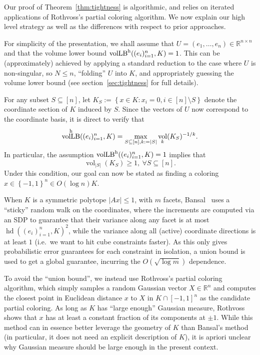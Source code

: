 \documentclass[11pt]{article}
\newcommand{\R}{{\mathbb{R}}}
\newcommand{\set}[1]{\left\{ #1 \right\}}
\DeclareMathOperator{\vollb}{volLB}
\DeclareMathOperator{\hd}{hd}
\DeclareMathOperator{\vol}{vol}
\begin{document}
Our proof of Theorem~\ref{thm:tightness} is algorithmic, and relies on iterated
applications of Rothvoss's partial coloring algorithm. We now explain our high
level strategy as well as the differences with respect to prior approaches. 

For simplicity of the presentation, we shall assume that $U=(e_1,\dots,e_n) \in
\R^{n \times n}$ and that the volume lower bound $\vollb^{\rm
h}((e_i)_{i=1}^n,K)=1$. This can be (approximately) achieved by applying a
standard reduction to the case where $U$ is non-singular, so $N \leq n$,
``folding'' $U$ into $K$, and appropriately guessing the volume lower bound (see
section~\ref{sec:tightness} for full details). 

For any subset $S \subseteq [n]$, let $K_S := \set{x \in K: x_i = 0, i \in [n]
\setminus S}$ denote the coordinate section of $K$ induced by $S$. Since the
vectors of $U$ now correspond to the coordinate basis, it is direct to verify that
\[
\vollb^{\rm h}((e_i)_{i=1}^n,K) = \max_{S \subseteq [n],k:=|S|}
\vol_k(K_S)^{-1/k} .
\]  
In particular, the assumption $\vollb^{\rm h}((e_i)_{i=1}^n,K) = 1$ implies that
\begin{equation}
\label{eq:big-volume}
\vol_{|S|}(K_S) \geq 1,~\forall S \subseteq [n]. 
\end{equation}
Under this condition, our goal can now be stated as finding a coloring $x \in
\set{-1,1}^n \in O(\log n) K$.

When $K$ is a symmetric polytope $|Ax| \leq 1$, with $m$ facets,
Bansal~\cite{Bansal10} uses a ``sticky'' random walk on the coordinates, where
the increments are computed via an SDP to guarantee that their variance along
any facet is at most $\hd((e_i)_{i=1}^n,K)^2$, while the variance along all
(active) coordinate directions is at least $1$ (i.e.~we want to hit cube
constraints faster). As this only gives probabilistic error guarantees for each
constraint in isolation, a union bound is used to get a global guarantee,
incurring the $O(\sqrt{\log m})$ dependence. 

To avoid the ``union bound'', we instead use Rothvoss's partial coloring
algorithm, which simply samples a random Gaussian vector $X \in \R^n$ and
computes the closest point in Euclidean distance $x$ to $X$ in $K \cap [-1,1]^n$
as the candidate partial coloring. As long as $K$ has ``large enough'' Gaussian
measure, Rothvoss shows that $x$ has at least
a constant fraction of its components at $\pm 1$. While this method can in
essence better leverage the geometry of $K$ than Bansal's method (in particular,
it does not need an explicit description of $K$), it is apriori unclear why Gaussian
measure should be large enough in the present context. 
\end{document}
